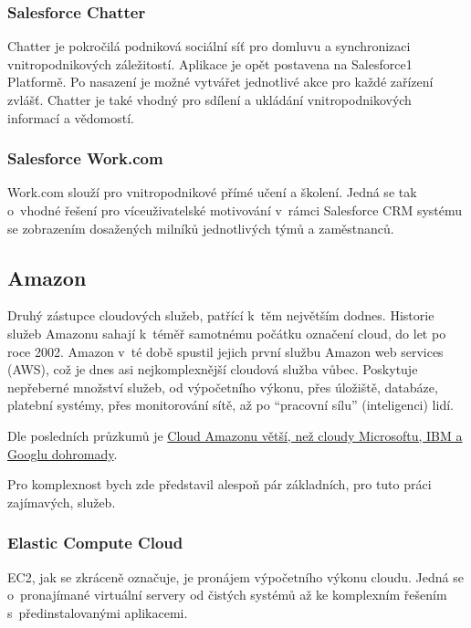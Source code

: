 \subsubsection{Salesforce Chatter}
Chatter je pokročilá podniková sociální síť pro domluvu a synchronizaci vnitropodnikových záležitostí. Aplikace je opět postavena na Salesforce1 Platformě. Po nasazení je možné vytvářet jednotlivé akce pro každé zařízení zvlášť. Chatter je také vhodný pro sdílení a ukládání vnitropodnikových informací a vědomostí.\cite{salesforce:chatter}

\subsubsection{Salesforce Work.com}
Work.com slouží pro vnitropodnikové přímé učení a školení. Jedná se tak o~vhodné řešení pro víceuživatelské motivování v~rámci Salesforce CRM systému se zobrazením dosažených milníků jednotlivých týmů a zaměstnanců.\cite{salesforce:work}

\subsection{Amazon}
Druhý zástupce cloudových služeb, patřící k~těm největším dodnes. Historie služeb Amazonu sahají k~téměř samotnému počátku označení cloud, do let po roce 2002. Amazon v~té době spustil jejich první službu Amazon web services (AWS), což je dnes asi nejkomplexnější cloudová služba vůbec. Poskytuje nepřeberné množství služeb, od výpočetního výkonu, přes úložiště, databáze, platební systémy, přes monitorování sítě, až po "`pracovní sílu"' (inteligenci) lidí.

Dle posledních průzkumů je \href{http://connect.zive.cz/bleskovky/cloud-amazonu-je-vetsi-nez-cloudy-microsoftu-ibm-a-googlu-dohromady/sc-321-a-171477/default.aspx}{Cloud Amazonu větší, než cloudy Microsoftu, IBM a Googlu dohromady\cite{zive:amazonCloud}}.

Pro komplexnost bych zde představil alespoň pár základních, pro tuto práci zajímavých, služeb.

\subsubsection{Elastic Compute Cloud}
\label{sec:AmazonElasticCC}
EC2, jak se zkráceně označuje, je pronájem výpočetního výkonu cloudu. Jedná se o~pronajímané virtuální servery od čistých systémů až ke komplexním řešením s~předinstalovanými aplikacemi.

